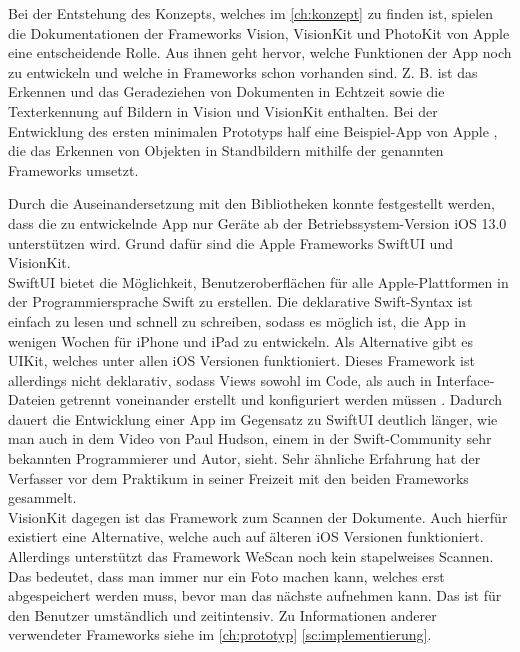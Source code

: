 \documentclass[notables, nomenclature, oneside, 150]{HSMW-Thesis}
\begin{document}
		Bei der Entstehung des Konzepts, welches im \autoref{ch:konzept} zu finden ist, spielen die Dokumentationen der Frameworks Vision, VisionKit und PhotoKit von Apple eine entscheidende Rolle. Aus ihnen geht hervor, welche Funktionen der App noch zu entwickeln und welche in Frameworks schon vorhanden sind. Z. B. ist das Erkennen und das Geradeziehen von Dokumenten in Echtzeit sowie die Texterkennung auf Bildern in Vision und VisionKit enthalten. Bei der Entwicklung des ersten minimalen Prototyps half eine Beispiel-App von Apple \cite{apple_detecting_2019}, die das Erkennen von Objekten in Standbildern mithilfe der genannten Frameworks umsetzt.
		
		Durch die Auseinandersetzung mit den Bibliotheken konnte festgestellt werden, dass die zu entwickelnde App nur Geräte ab der Betriebssystem-Version iOS 13.0 unterstützen wird. Grund dafür sind die Apple Frameworks SwiftUI und VisionKit. \\
		SwiftUI bietet die Möglichkeit, Benutzeroberflächen für alle Apple-Plattformen in der Programmiersprache Swift zu erstellen. Die deklarative Swift-Syntax ist einfach zu lesen und schnell zu schreiben, sodass es möglich ist, die App in wenigen Wochen für iPhone und iPad zu entwickeln. Als Alternative gibt es UIKit, welches unter allen iOS Versionen funktioniert. Dieses Framework ist allerdings nicht deklarativ, sodass Views sowohl im Code, als auch in Interface-Dateien getrennt voneinander erstellt und konfiguriert werden müssen \cite{sillmann_einstieg_2019}. Dadurch dauert die Entwicklung einer App im Gegensatz zu SwiftUI deutlich länger, wie man auch in dem Video von Paul Hudson, einem in der Swift-Community sehr bekannten Programmierer und Autor, sieht. Sehr ähnliche Erfahrung hat der Verfasser vor dem Praktikum in seiner Freizeit mit den beiden Frameworks gesammelt. \\
		VisionKit dagegen ist das Framework zum Scannen der Dokumente. Auch hierfür existiert eine Alternative, welche auch auf älteren iOS Versionen funktioniert. Allerdings unterstützt das Framework WeScan noch kein stapelweises Scannen. Das bedeutet, dass man immer nur ein Foto machen kann, welches erst abgespeichert werden muss, bevor man das nächste aufnehmen kann. Das ist für den Benutzer umständlich und zeitintensiv. Zu Informationen anderer verwendeter Frameworks siehe im \autoref{ch:prototyp} \autoref{sc:implementierung}.
\end{document}
